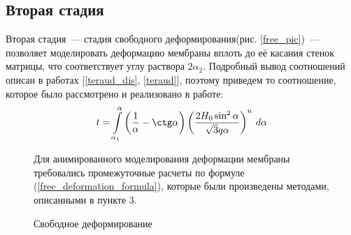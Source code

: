 	\subsection{Вторая стадия}
		Вторая стадия~--- стадия свободного деформирования(рис. \ref{free_pic})~--- позволяет моделировать 
    	деформацию мембраны вплоть до её касания стенок матрицы, что соответствует углу раствора $2\alpha_2$. Подробный вывод 
    	соотношений описан в работах  [\ref{teraud_dis}, \ref{teraud}], поэтому приведем то соотношение, которое было рассмотрено и реализовано 
    	в работе:
		\begin{equation}
        	t = \int\limits_{\alpha_1}^{\alpha}\left(\dfrac 1\alpha - \ctg\alpha \right)\left( \dfrac{2H_0\sin^2\alpha}{\sqrt 3 q\alpha} 
        	\right)^n\,d\alpha
	        \label{free_deformation_formula}
	    \end{equation}
	\begin{figure}[h!]
		\begin{minipage}[h]{0.48\linewidth}

				
				\def\svgwidth{\columnwidth}
		
			\caption{ Свободное деформирование } 
			\label{free_pic}
		\end{minipage}
		\hfill
		\begin{minipage}[h]{0.48\linewidth}	
Для анимированного моделирования деформации мембраны требовались промежуточные
	расчеты по формуле (\ref{free_deformation_formula}), которые были произведены методами, описанными в пункте 3.

	
		\end{minipage}
		\label{free_deformation_pic}
	\end{figure}
	
